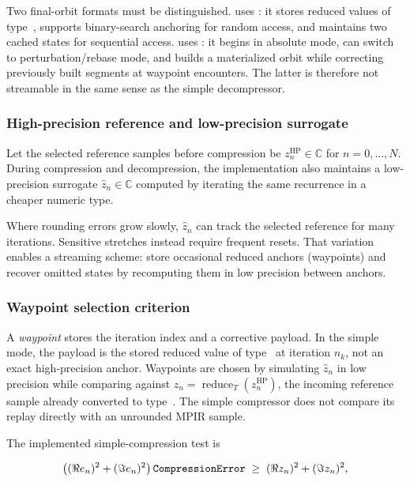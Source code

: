 Two final-orbit formats must be distinguished.   uses
: it stores reduced values of type~, supports
binary-search anchoring for random access, and maintains two cached states for
sequential access.   uses : it begins in
absolute mode, can switch to perturbation/rebase mode, and builds a materialized
orbit while correcting previously built segments at waypoint encounters.  The latter
is therefore not streamable in the same sense as the simple decompressor.

\subsubsection{High-precision reference and low-precision surrogate}
Let the selected reference samples before compression be
\(
z_n^{\mathrm{HP}} \in \mathbb{C}
\)
for \(n=0,\dots,N\).
During compression and decompression, the implementation also maintains a low-precision surrogate
\(
\hat z_n \in \mathbb{C}
\)
computed by iterating the same recurrence in a cheaper numeric type.

Where rounding errors grow slowly, \(\hat z_n\) can track the selected
reference for many iterations.  Sensitive stretches instead require frequent
resets.  That variation enables a streaming scheme:
store occasional reduced anchors (waypoints) and recover omitted states by
recomputing them in low precision between anchors.

\subsubsection{Waypoint selection criterion}
A \emph{waypoint} stores the iteration index and a corrective payload.
In the simple mode, the payload is the stored reduced value of type~ at
iteration \(n_k\), not an exact high-precision anchor.
Waypoints are chosen by simulating \(\hat z_n\) in low precision while comparing
against $z_n=\operatorname{reduce}_T(z_n^{\mathrm{HP}})$, the incoming
reference sample already converted to type~.  The simple compressor
does not compare its replay directly with an unrounded MPIR sample.

The implemented simple-compression test is

\begin{equation}
  \left((\Re e_n)^2+(\Im e_n)^2\right)
  \texttt{CompressionError}
  \;\ge\; (\Re z_n)^2+(\Im z_n)^2,
  \label{eq:relerr-test}
\end{equation}

